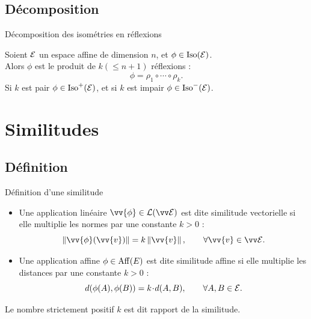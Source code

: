 \documentclass{m53beamer}
\begin{document}
\subsection{Décomposition}
\begin{frame}{Décomposition des isométries en réflexions}
  \pause
  \begin{proposition}
    Soient $\mathcal{E}$ un espace affine de dimension $n$, et $\phi \in \operatorname{Iso}(\mathcal{E})$.\pause\\
    Alors $\phi$ est le produit de $k (\leq n+1)$ réflexions :
    \[
      \phi = \rho_{1}\circ\cdots\circ\rho_{k}.
    \]\pause
    Si $k$ est pair $\phi \in \operatorname{Iso}^{+}(\mathcal{E})$, et si $k$ est impair $\phi \in \operatorname{Iso}^{-}(\mathcal{E})$.
  \end{proposition}
\end{frame}

\section{Similitudes}

\subsection{Définition}
\begin{frame}{Définition d'une similitude}
  \begin{definition}
    \begin{itemize}[<+(1)->]
      \item Une application linéaire $\vv{\phi} \in \lin(\ev{E})$ est dite \alert{similitude vectorielle} si elle multiplie les normes par une constante $k > 0$ :
      \[
          \norm{\vv{\phi}(\vv{v})} = k\norm{\vv{v}},\qquad \forall \vv{v} \in \ev{E}.
      \]
      \item Une application affine $\phi  \in \operatorname{Aff}(E)$ est dite \alert{similitude affine} si elle multiplie les distances par une constante $k > 0$ :
      \[
          d(\phi(A),\phi(B)) = k\!\cdot\!d(A,B),\qquad \forall A,B \in \mathcal{E}.
      \]
    \end{itemize}\pause
    Le nombre strictement positif $k$ est dit \alert{rapport de la similitude}.
  \end{definition}
\end{frame}
\end{document}
